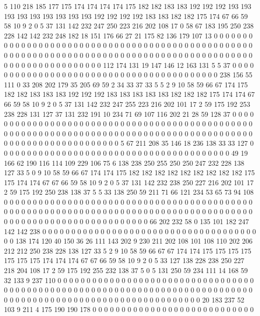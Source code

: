 5 110 218 185 177 175 174 174 174 174 175 182 182 183 183 192 192 192 193 193
193 193 193 193 193 193 193 192 192 192 192 183 183 182 182 175 174 67 66 59
58 10 9 2 0 5 37 131 142 232 247 250 223 216 202 108 17 0 58 67
183 195 250 238 228 142 142 232 248 182 18 151 176 66 27 21 175 82 136 179
107 13 0 0 0 0 0 0 0 0 0 0 0 0 0 0 0 0 0 0
0 0 0 0 0 0 0 0 0 0 0 0 0 0 0 0 0 0 0 0
0 0 0 0 0 0 0 0 0 0 0 0 0 0 0 0 0 0 0 0
0 0 0 0 0 0 0 0 0 0 0 0 0 0 0 0 0 0 0 0
0 0 0 0 0 0 0 0 0 0 0 0 0 0 0 0 0 0 0 0
0 0 0 0 0 0 0 0 0 0 0 0 112 174 131 19 147 146 12 163
131 5 5 37 0 0 0 0 0 0 0 0 0 0 0 0 0 0 0 0
0 0 0 0 0 0 0 0 0 0 0 0 0 0 0 0 0 0 0 0
0 0 0 0 0 238 156 55 111 0 33 208 202 179 35 205 69 59 2 34
33 37 33 5 5 2 9 10 58 59 66 67 174 175 182 182 183 183 183 192
192 192 183 183 183 183 183 182 182 182 175 174 174 67 66 59 58 10 9 2
0 5 37 131 142 232 247 255 223 216 202 101 17 2 59 175 192 253 238 228
131 127 37 131 232 191 10 234 71 69 107 116 202 21 28 59 128 37 0 0
0 0 0 0 0 0 0 0 0 0 0 0 0 0 0 0 0 0 0 0
0 0 0 0 0 0 0 0 0 0 0 0 0 0 0 0 0 0 0 0
0 0 0 0 0 0 0 0 0 0 0 0 0 0 0 0 0 0 0 0
0 0 0 0 0 0 0 0 0 0 0 0 0 0 0 0 0 0 0 0
0 0 0 0 0 0 0 0 0 0 0 0 0 0 0 0 0 0 0 0
0 0 0 0 0 0 0 0 5 67 211 208 35 146 18 236 138 33 33 127
0 0 0 0 0 0 0 0 0 0 0 0 0 0 0 0 0 0 0 0
0 0 0 0 0 0 0 0 0 0 0 0 0 0 0 0 0 0 0 0
49 19 166 62 190 116 114 109 229 106 75 6 138 238 250 255 250 250 247 232
228 138 127 33 5 0 9 10 58 59 66 67 174 174 175 182 182 182 182 182
182 182 182 182 175 175 174 174 67 67 66 59 58 10 9 2 0 5 37 131
142 232 238 250 227 216 202 101 17 2 59 175 192 250 238 138 37 5 5 33
138 250 59 211 71 66 121 234 53 65 73 94 108 0 0 0 0 0 0 0
0 0 0 0 0 0 0 0 0 0 0 0 0 0 0 0 0 0 0 0
0 0 0 0 0 0 0 0 0 0 0 0 0 0 0 0 0 0 0 0
0 0 0 0 0 0 0 0 0 0 0 0 0 0 0 0 0 0 0 0
0 0 0 0 0 0 0 0 0 0 0 0 0 0 0 0 0 0 0 0
0 0 0 0 0 0 0 0 0 0 0 0 0 0 0 0 0 0 0 0
0 0 0 0 66 202 232 58 0 135 101 182 247 142 142 238 0 0 0 0
0 0 0 0 0 0 0 0 0 0 0 0 0 0 0 0 0 0 0 0
0 0 0 0 0 0 0 0 0 0 0 0 0 0 0 138 174 120 40 150
36 26 111 143 202 9 230 211 202 108 101 108 110 202 206 212 212 250 238 228
138 127 33 5 2 9 10 58 59 66 67 67 174 174 175 175 175 175 175 175
175 174 174 174 67 67 66 59 58 10 9 2 0 5 33 127 138 228 238 250
227 218 204 108 17 2 59 175 192 255 232 138 37 5 0 5 131 250 59 234
111 14 168 59 32 133 9 237 110 0 0 0 0 0 0 0 0 0 0 0
0 0 0 0 0 0 0 0 0 0 0 0 0 0 0 0 0 0 0 0
0 0 0 0 0 0 0 0 0 0 0 0 0 0 0 0 0 0 0 0
0 0 0 0 0 0 0 0 0 0 0 0 0 0 0 0 0 0 0 0
0 0 0 0 0 0 0 0 0 0 0 0 0 0 0 0 0 0 0 0
0 0 0 0 0 0 0 0 0 0 0 0 0 0 0 0 0 0 0 0
20 183 237 52 103 9 211 4 175 190 190 178 0 0 0 0 0 0 0 0
0 0 0 0 0 0 0 0 0 0 0 0 0 0 0 0 0 0 0 0
